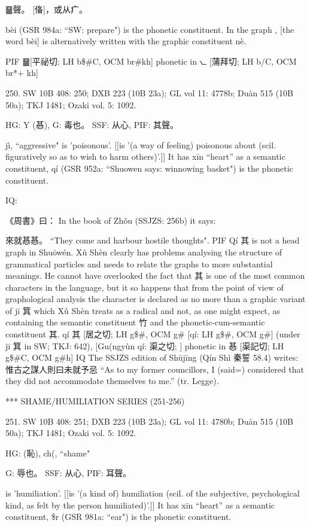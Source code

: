 ䷍聲。
   [俻]，或从疒。

bèi (GSR 984a: ``SW: prepare") is the phonetic constituent. In the graph , [the word bèi] is alternatively written with the graphic constituent nè.

PIF     ䷍[平祕切; LH b\$\#C, OCM br\#kh] phonetic in ⦦ [蒲拜切; LH b/C, OCM br*+ kh]



250. SW 10B 408: 250; DXB 223 (10B 23a); GL vol 11: 4778b; Duàn 515 (10B 50a); TKJ 1481; Ozaki vol. 5: 1092.

HG:  Y (惎),
G:	毒也。
SSF: 从心,
PIF: 其聲。


jì, ``aggressive"
is 'poisonous'. [[is '(a way of feeling) poisonous about (scil. figuratively so as to wish to harm others)'.]]
It has xīn ``heart'' as a semantic constituent,
qí (GSR 952a: ``Shuowen says: winnowing basket") is the phonetic constituent.

IQ:

《周書》曰： In the book of Zhǒu (SSJZS: 256b) it says:

來就惎惎。 ``They come and harbour hostile thoughts".
PIF   Qí 其 is not a head graph in Shuōwén. Xǔ Shèn clearly has problems analysing the structure of grammatical particles and needs to relate the graphs to more substantial meanings. He cannot have overlooked the fact that 其 is one of the most common characters in the language, but it so happens that from the point of view of graphological analysis the character is declared as no more than a graphic variant of jī 箕 which Xǔ Shèn treats as a radical and not, as one might expect, as containing the semantic constituent 竹 and the phonetic-cum-semantic constituent 其.
qí 其 [居之切; LH g\$\#, OCM g\# [qí: LH g\$\#, OCM g\#] (under jī 箕 in SW;  TKJ: 642),
[Gu(ngyùn qí: 渠之切; ] phonetic in 惎 [渠記切; LH g\$\#C, OCM g\#h]
IQ The SSJZS edition of Shūjīng (Qín Shì 秦誓 58.4) writes: 惟古之謀人則曰未就予忌 ``As to my former councillors, I (said=) considered that they did not accommodate themselves to me.'' (tr. Legge).

                 *** SHAME/HUMILIATION SERIES (251-256)

251. SW 10B 408: 251; DXB 223 (10B 23a); GL vol 11: 4780b; Duàn 515 (10B 50a); TKJ 1481; Ozaki vol. 5: 1092.

HG:	(恥), ch(, ``shame"

G:	辱也。
SSF: 从心,
PIF: 耳聲。

is 'humiliation'. [[is '(a kind of) humiliation (scil. of the subjective, psychological kind, as felt by the person humiliated)'.]]
It has xīn ``heart'' as a semantic constituent,
\$r (GSR 981a: ``ear") is the phonetic constituent.

